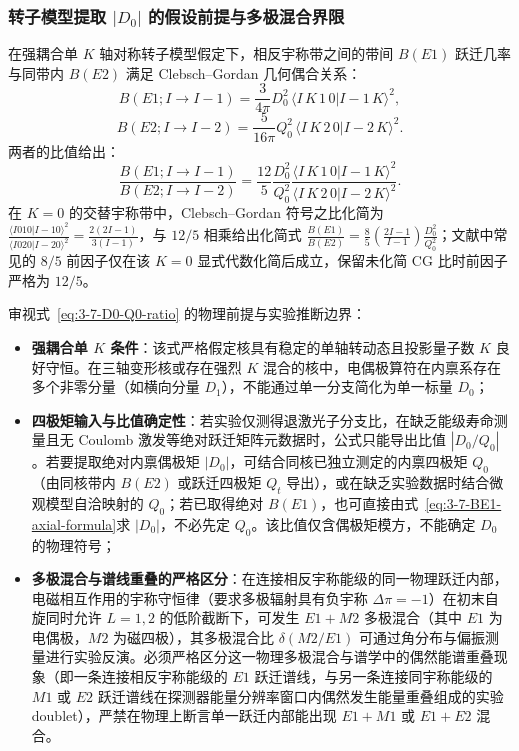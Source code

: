\subsubsection{转子模型提取 $|D_0|$ 的假设前提与多极混合界限}

在强耦合单 $K$ 轴对称转子模型假定下，相反宇称带之间的带间 $B(E1)$ 跃迁几率与同带内 $B(E2)$ 满足 Clebsch--Gordan 几何偶合关系：
\begin{equation}\label{eq:3-7-BE1-axial-formula}
B(E1; I \to I-1) = \frac{3}{4\pi} D_0^2 \, \langle I \, K \, 1 \, 0 | I-1 \, K \rangle^2,
\end{equation}
\begin{equation}\label{eq:3-7-BE2-axial-formula}
B(E2; I \to I-2) = \frac{5}{16\pi} Q_0^2 \, \langle I \, K \, 2 \, 0 | I-2 \, K \rangle^2.
\end{equation}
两者的比值给出：
\begin{equation}\label{eq:3-7-D0-Q0-ratio}
\frac{B(E1; I \to I-1)}{B(E2; I \to I-2)} = \frac{12}{5} \frac{D_0^2}{Q_0^2} \frac{\langle I \, K \, 1 \, 0 | I-1 \, K \rangle^2}{\langle I \, K \, 2 \, 0 | I-2 \, K \rangle^2}.
\end{equation}
在 $K=0$ 的交替宇称带中，Clebsch--Gordan 符号之比化简为 $\frac{\langle I 0 1 0 | I-1 0 \rangle^2}{\langle I 0 2 0 | I-2 0 \rangle^2} = \frac{2(2I-1)}{3(I-1)}$，与 $12/5$ 相乘给出化简式 $\frac{B(E1)}{B(E2)} = \frac{8}{5} \left( \frac{2I-1}{I-1} \right) \frac{D_0^2}{Q_0^2}$；文献中常见的 $8/5$ 前因子仅在该 $K=0$ 显式代数化简后成立，保留未化简 CG 比时前因子严格为 $12/5$。

审视式~\eqref{eq:3-7-D0-Q0-ratio} 的物理前提与实验推断边界：
\begin{itemize}
\item \textbf{强耦合单 $K$ 条件}：该式严格假定核具有稳定的单轴转动态且投影量子数 $K$ 良好守恒。在三轴变形核或存在强烈 $K$ 混合的核中，电偶极算符在内禀系存在多个非零分量（如横向分量 $D_1$），不能通过单一分支简化为单一标量 $D_0$；
\item \textbf{四极矩输入与比值确定性}：若实验仅测得退激光子分支比，在缺乏能级寿命测量且无 Coulomb 激发等绝对跃迁矩阵元数据时，公式只能导出比值 $|D_0 / Q_0|$。若要提取绝对内禀偶极矩 $|D_0|$，可结合同核已独立测定的内禀四极矩 $Q_0$（由同核带内 $B(E2)$ 或跃迁四极矩 $Q_t$ 导出），或在缺乏实验数据时结合微观模型自洽映射的 $Q_0$；若已取得绝对 $B(E1)$，也可直接由式~\eqref{eq:3-7-BE1-axial-formula}求 $|D_0|$，不必先定 $Q_0$。该比值仅含偶极矩模方，不能确定 $D_0$ 的物理符号；
\item \textbf{多极混合与谱线重叠的严格区分}：在连接相反宇称能级的同一物理跃迁内部，电磁相互作用的宇称守恒律（要求多极辐射具有负宇称 $\Delta \pi = -1$）在初末自旋同时允许 $L=1,2$ 的低阶截断下，可发生 $E1 + M2$ 多极混合（其中 $E1$ 为电偶极，$M2$ 为磁四极），其多极混合比 $\delta(M2/E1)$ 可通过角分布与偏振测量进行实验反演。必须严格区分这一物理多极混合与谱学中的偶然能谱重叠现象（即一条连接相反宇称能级的 $E1$ 跃迁谱线，与另一条连接同宇称能级的 $M1$ 或 $E2$ 跃迁谱线在探测器能量分辨率窗口内偶然发生能量重叠组成的实验 doublet），严禁在物理上断言单一跃迁内部能出现 $E1 + M1$ 或 $E1 + E2$ 混合。
\end{itemize}

